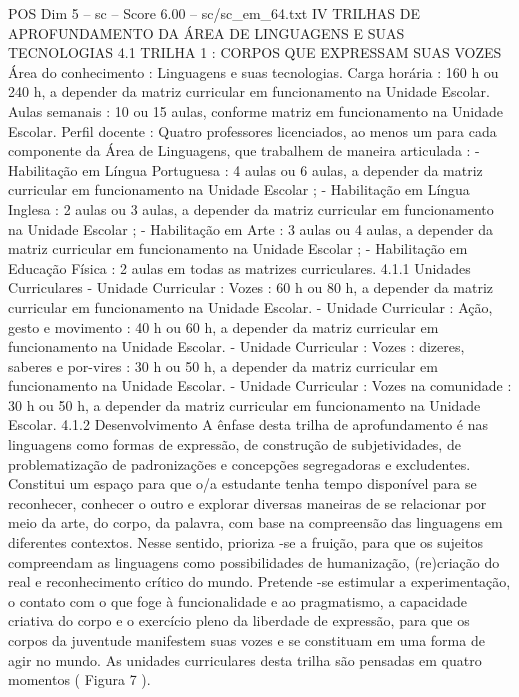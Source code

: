 \begin{textsample}{POS Dim 5 – sc – Score 6.00 – sc/sc\_em\_64.txt}  \label{ex:f5_pos_037}
IV TRILHAS DE APROFUNDAMENTO DA ÁREA DE LINGUAGENS E SUAS TECNOLOGIAS 4.1 TRILHA 1 : CORPOS QUE EXPRESSAM SUAS VOZES Área do conhecimento : Linguagens e suas tecnologias.
Carga horária : 160 h ou 240 h, a depender da matriz curricular em funcionamento na Unidade Escolar.
Aulas semanais : 10 ou 15 aulas, conforme matriz em funcionamento na Unidade Escolar.
Perfil docente : Quatro professores licenciados, ao menos um para cada componente da Área de Linguagens, que trabalhem de maneira articulada : - Habilitação em Língua Portuguesa : 4 aulas ou 6 aulas, a depender da matriz curricular em funcionamento na Unidade Escolar ; - Habilitação em Língua Inglesa : 2 aulas ou 3 aulas, a depender da matriz curricular em funcionamento na Unidade Escolar ; - Habilitação em Arte : 3 aulas ou 4 aulas, a depender da matriz curricular em funcionamento na Unidade Escolar ; - Habilitação em Educação Física : 2 aulas em todas as matrizes curriculares. 4.1.1 Unidades Curriculares - Unidade Curricular : Vozes : 60 h ou 80 h, a depender da matriz curricular em funcionamento na Unidade Escolar. - Unidade Curricular : Ação, gesto e movimento : 40 h ou 60 h, a depender da matriz curricular em funcionamento na Unidade Escolar. - Unidade Curricular : Vozes : dizeres, saberes e por-vires : 30 h ou 50 h, a depender da matriz curricular em funcionamento na Unidade Escolar. - Unidade Curricular : Vozes na comunidade : 30 h ou 50 h, a depender da matriz curricular em funcionamento na Unidade Escolar. 4.1.2 Desenvolvimento A ênfase desta trilha de aprofundamento é nas linguagens como formas de expressão, de construção de subjetividades, de problematização de padronizações e concepções segregadoras e excludentes.
Constitui um espaço para que o/a estudante tenha tempo disponível para se reconhecer, conhecer o outro e explorar diversas maneiras de se relacionar por meio da arte, do corpo, da palavra, com base na compreensão das linguagens em diferentes contextos.
Nesse sentido, prioriza -se a fruição, para que os sujeitos compreendam as linguagens como possibilidades de humanização, (re)criação do real e reconhecimento crítico do mundo.
Pretende -se estimular a experimentação, o contato com o que foge à funcionalidade e ao pragmatismo, a capacidade criativa do corpo e o exercício pleno da liberdade de expressão, para que os corpos da juventude manifestem suas vozes e se constituam em uma forma de agir no mundo.
As unidades curriculares desta trilha são pensadas em quatro momentos ( Figura 7 ).

\end{textsample}
